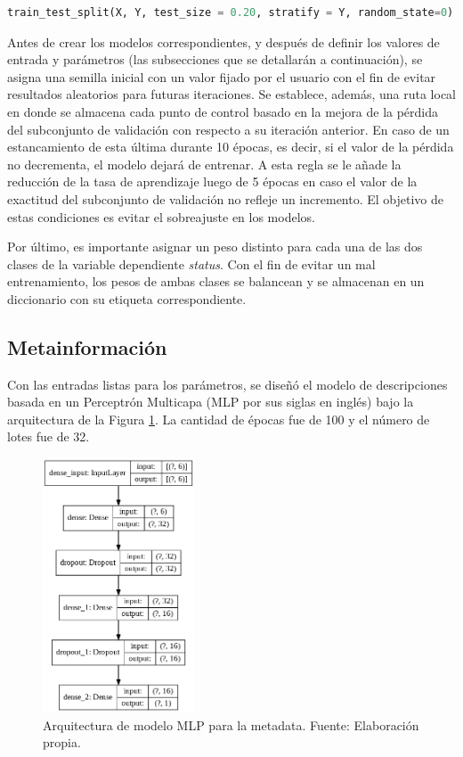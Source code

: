 \begin{lstlisting}[language=Python]
train_test_split(X, Y, test_size = 0.20, stratify = Y, random_state=0)
\end{lstlisting}

Antes de crear los modelos correspondientes, y después de definir los valores de entrada y parámetros (las subsecciones que se detallarán a continuación), se asigna una semilla inicial con un valor fijado por el usuario con el fin de evitar resultados aleatorios para futuras iteraciones. Se establece, además, una ruta local en donde se almacena cada punto de control basado en la mejora de la pérdida del subconjunto de validación con respecto a su iteración anterior. En caso de un estancamiento de esta última durante 10 épocas, es decir, si el valor de la pérdida no decrementa, el modelo dejará de entrenar. A esta regla se le añade la reducción de la tasa de aprendizaje luego de 5 épocas en caso el valor de la exactitud del subconjunto de validación no refleje un incremento. El objetivo de estas condiciones es evitar el sobreajuste en los modelos.

Por último, es importante asignar un peso distinto para cada una de las dos clases de la variable dependiente \textit{status}. Con el fin de evitar un mal entrenamiento, los pesos de ambas clases se balancean y se almacenan en un diccionario con su etiqueta correspondiente.

\subsection{Metainformación}
Con las entradas listas para los parámetros, se diseñó el modelo de descripciones basada en un Perceptrón Multicapa (MLP por sus siglas en inglés) bajo la arquitectura de la Figura \ref{4:fig34}. La cantidad de épocas fue de 100 y el número de lotes fue de 32.

\begin{figure}[!ht]
	\begin{center}
		\includegraphics[width=0.40\textwidth]{4/figures/model_mlp_metadata.png}
		\caption{Arquitectura de modelo MLP para la metadata. Fuente: Elaboración propia.}
		\label{4:fig34}
	\end{center}
\end{figure}

